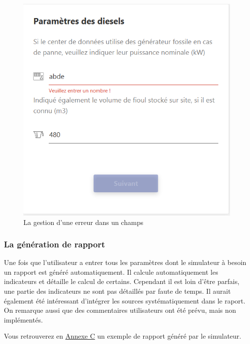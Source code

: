 \begin{figure}[h!]
	\begin{center}
		\includegraphics[scale=0.6]{partie3/images/verif.png}
		\caption{La gestion d'une erreur dans un champs}
	\end{center}
\end{figure}
\newpage
\subsubsection{La génération de rapport}
Une fois que l'utilisateur a entrer tous les paramètres dont le simulateur à besoin un rapport est généré automatiquement. Il calcule automatiquement les indicateurs et détaille le calcul de certains. Cependant il est loin d'être parfais, une  partie des indicateurs ne sont pas détaillés par faute de temps. Il aurait également été intéressant d'intégrer les sources systématiquement dans le raport. On remarque aussi que des commentaires utilisateurs ont été prévu, mais non implémentés.

Vous retrouverez en \hyperref[appendix:report]{Annexe C} un exemple de rapport généré par le simulateur.